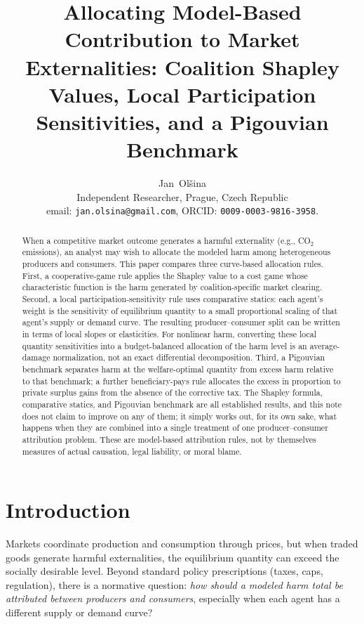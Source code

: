 \documentclass[journal, a4paper]{IEEEtran}
\begin{document}
\title{Allocating Model-Based Contribution to Market Externalities: Coalition Shapley Values, Local Participation Sensitivities, and a Pigouvian Benchmark}

\author{Jan~Ol\v{s}ina\\[1ex] Independent Researcher, Prague, Czech Republic\\
email: \texttt{jan.olsina@gmail.com},  ORCID: \texttt{0009-0003-9816-3958}.}


\maketitle

\begin{abstract}
When a competitive market outcome generates a harmful externality (e.g., CO$_2$ emissions), an analyst may wish to allocate the modeled harm among heterogeneous producers and consumers. This paper compares three curve-based allocation rules. First, a cooperative-game rule applies the Shapley value to a cost game whose characteristic function is the harm generated by coalition-specific market clearing. Second, a local participation-sensitivity rule uses comparative statics: each agent's weight is the sensitivity of equilibrium quantity to a small proportional scaling of that agent's supply or demand curve. The resulting producer--consumer split can be written in terms of local slopes or elasticities. For nonlinear harm, converting these local quantity sensitivities into a budget-balanced allocation of the harm level is an average-damage normalization, not an exact differential decomposition. Third, a Pigouvian benchmark separates harm at the welfare-optimal quantity from excess harm relative to that benchmark; a further beneficiary-pays rule allocates the excess in proportion to private surplus gains from the absence of the corrective tax. The Shapley formula, comparative statics, and Pigouvian benchmark are all established results, and this note does not claim to improve on any of them; it simply works out, for its own sake, what happens when they are combined into a single treatment of one producer--consumer attribution problem. These are model-based attribution rules, not by themselves measures of actual causation, legal liability, or moral blame.
\end{abstract}

\section{Introduction}
Markets coordinate production and consumption through prices, but when traded goods generate harmful externalities, the equilibrium quantity can exceed the socially desirable level. Beyond standard policy prescriptions (taxes, caps, regulation), there is a normative question: \emph{how should a modeled harm total be attributed between producers and consumers}, especially when each agent has a different supply or demand curve?
\end{document}
